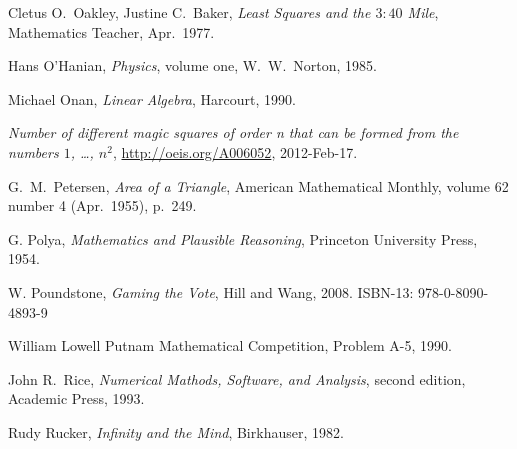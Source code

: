 \begin{thebibliography}{\makebox[2em][c]{{}\hfil{}}}


  Cletus O.\ Oakley, Justine C.\ Baker,
  \emph{Least Squares and the $3:40$ Mile},
  Mathematics Teacher,
  Apr.\ 1977.

  Hans O'Hanian,
  \emph{Physics},
  volume one,
  W.\ W.\ Norton,
  1985.

  Michael Onan,
  \emph{Linear Algebra},
  Harcourt,
  1990.

  \emph{Number of different magic squares of order n that can be formed from the numbers $1$, \ldots, $n^2$},
  \url{http://oeis.org/A006052},
  2012-Feb-17.

  G.\ M.\ Petersen,
  \emph{Area of a Triangle},
  American Mathematical Monthly,
  volume 62 number 4 (Apr.\ 1955),
  p.~249.

  G. Polya,
  \emph{Mathematics and Plausible Reasoning},
  Princeton University Press,
  1954.

  W. Poundstone,
  \emph{Gaming the Vote},
  Hill and Wang, 2008.
  ISBN-13: 978-0-8090-4893-9 



  William Lowell Putnam Mathematical Competition,
  Problem A-5, 1990.

  John R.\ Rice,
  \emph{Numerical Mathods, Software, and Analysis},
  second edition,
  Academic Press,
  1993.


  Rudy Rucker,
  \emph{Infinity and the Mind},
  Birkhauser,
  1982.


\end{thebibliography}
